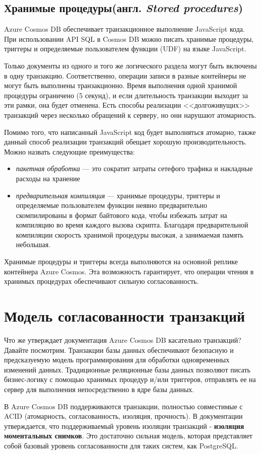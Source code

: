 \documentclass[12pt,  openany]{book}
\begin{document}
\subsection{Хранимые процедуры(англ. \textit{Stored procedures})}
Azure Cosmos DB обеспечивает транзакционное выполнение JavaScript кода. При использовании API SQL в  Cosmos DB можно писать хранимые процедуры, триггеры и определяемые пользователем функции (UDF) на языке JavaScript. 
\par Только документы из одного и того же логического раздела могут быть включены в одну транзакцию.  Соответственно, операции записи в разные контейнеры не могут быть выполнены транзакционно. Время выполнения одной хранимой процедуры ограничено (5 секунд), и если длительность транзакции выходит за эти рамки, она будет отменена. Есть способы реализации <<долгоживущих>> транзакций через несколько обращений к серверу, но они нарушают атомарность.
\par Помимо того, что написанный JavaScript код будет выполняться атомарно, также данный  способ реализации транзакций обещает хорошую производительность. Можно назвать следующие преимущества:
\begin{itemize}
\item \textit{пакетная обработка} --- это сократит затраты сетефого трафика и накладные расходы на хранение
\item  \textit{предварительная компиляция} --- хранимые процедуры, триггеры и определяемые пользователем функции неявно предварительно скомпилированы в формат байтового кода, чтобы избежать затрат на компиляцию во время каждого вызова скрипта. Благодаря предварительной компиляции скорость хранимой процедуры высокая, а занимаемая память небольшая.
\end{itemize}
\par
Хранимые процедуры и триггеры всегда выполняются на основной реплике контейнера Azure Cosmos. Эта возможность гарантирует, что операции чтения в хранимых процедурах обеспечивают сильную согласованность. 

\section{Модель согласованности транзакций}
Что же утверждает документация Azure Cosmos DB касательно транзакций? Давайте посмотрим.
Транзакции базы данных обеспечивают безопасную и предсказуемую модель программирования для обработки одновременных изменений данных. Традиционные реляционные базы данных позволяют писать бизнес-логику с помощью хранимых процедур и/или триггеров, отправлять ее на сервер для выполнения непосредственно в ядре базы данных. 
\par
В Azure Cosmos DB поддерживаются транзакции, полностью совместимые с ACID (атомарность, согласованность, изоляция, прочность). В документации утверждается, что поддерживаемый уровень изоляции транзакций - \textbf{изоляция моментальных снимков}.  Это достаточно сильная модель, которая представляет собой базовый уровень согласованности для таких систем, как PostgreSQL. 
\end{document}
